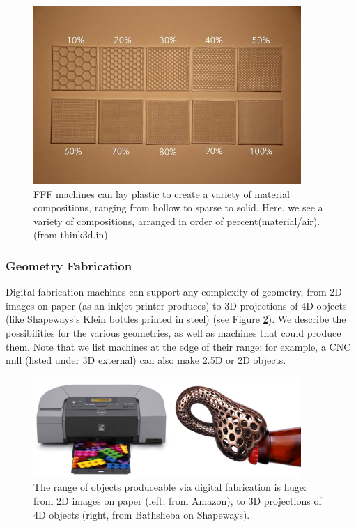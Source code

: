 \begin{figure}
\centering
\includegraphics[width=4in]{figures/infills.jpg}
\caption{FFF machines can lay plastic to create a variety of material compositions, ranging from hollow to sparse to solid. Here, we see a variety of compositions, arranged in order of percent(material/air). (from think3d.in)}
\label{fig:composition}
\end{figure}

\subsubsection{Geometry Fabrication}

Digital fabrication machines can support any complexity of geometry, from 2D images on paper (as an inkjet printer produces) to 3D projections of 4D objects (like Shapeways's Klein bottles printed in steel) (see Figure \ref{fig:range}). We describe the possibilities for the various geometries, as well as machines that could produce them. Note that we list machines at the edge of their range: for example, a CNC mill (listed under 3D external) can also make 2.5D or 2D objects.

\begin{figure}
\centering
\includegraphics[width=4in]{figures/range.png}
\caption{The range of objects produceable via digital fabrication is huge: from 2D images on paper (left, from Amazon), to 3D projections of 4D objects (right, from Bathsheba on Shapeways).}
\label{fig:range}
\end{figure}

